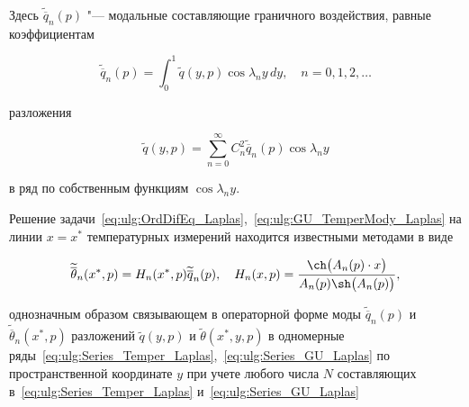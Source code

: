 Здесь $ {\widetilde  {\overline q} _n}(p) $ "--- модальные составляющие граничного воздействия, равные коэффициентам

\begin{equation}\label{eq:ulg:Coeff_GU_Laplas}

{\widetilde  {\overline q} _n}(p) = \int _0^1 {\widetilde q(y,p)}  \cos \lambda_n y\,dy,\quad n = 0, 1, 2, \dots

\end{equation}

 разложения 

\begin{equation}\label{eq:ulg:Series_GU_Laplas}

\widetilde q(y,p) = \sum\limits_{n = 0}^\infty  {C_n^2{{\widetilde  {\overline q} }_n}(p)}   \cos \lambda_n y

\end{equation}

в ряд по собственным функциям  $  \cos \lambda_n y $.



Решение задачи~\eqref{eq:ulg:OrdDifEq_Laplas},~\eqref{eq:ulg:GU_TemperMody_Laplas} на линии  $  x=x^* $ температурных измерений находится известными методами в виде

\begin{equation}


\widetilde  {\overline \theta } _n(x^*,p) =  H_n(x^*,p){\widetilde  {\overline q} _n}(p), \quad 



 \label{eq:ulg:TransferFunc_TemperMody_GU_Mody_Laplas}

 H_n(x,p) = \frac{\ch\bigl({A_n}(p) \cdot x\bigr)}{{A_n}(p) \sh\bigl({A_n}(p)\bigr)},

\end{equation}

однозначным образом связывающем в операторной форме моды  ${\widetilde  {\overline q} _n}(p) $ \linebreak и ${\widetilde  {\overline \theta } _n}(x^*,p) $   разложений $  \widetilde q(y,p)$  и  $\widetilde \theta (x^*,y,p) $ в одномерные ряды~\eqref{eq:ulg:Series_Temper_Laplas},~\eqref{eq:ulg:Series_GU_Laplas} по пространственной координате $ y $   при учете любого числа $  N $  составляющих в~\eqref{eq:ulg:Series_Temper_Laplas} и~\eqref{eq:ulg:Series_GU_Laplas}

